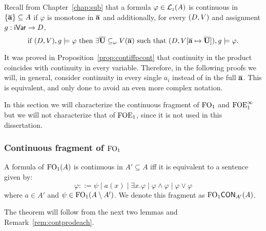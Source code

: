 
Recall from Chapter~\ref{chap:sub} that a formula $\varphi \in \mathcal{L}_{\scriptscriptstyle 1}(A)$ is continuous in $\{\overline{{\mathbf{a}}}\} \subseteq A$ if $\varphi$ is monotone in $\overline{{\mathbf{a}}}$ and additionally, for every $(D,V)$ and assignment $g:\mathsf{iVar}\to D$,
\[
\text{if } (D,\val),\ass \models \varphi \text{ then } \exists \vlist{U} \subseteq_\omega \val(\vlist{a}) \text{ such that } (D, \val[\vlist{a} \mapsto \vlist{U}]),\ass \models \varphi.
\]

\begin{remark}\label{rem:contprodeach}
	It was proved in Proposition~\ref{prop:contiffpcont} that continuity in the product coincides with continuity in every variable. Therefore, in the following proofs we will, in general, consider continuity in every single $a_i$ instead of in the full $\overline{{\mathbf{a}}}$. This is equivalent, and only done to avoid an even more complex notation.
\end{remark}

In this section we will characterize the continuous fragment of $\mathrm{FO}_1$ and $\mathrm{FOE}^{\infty}_1$ but we will not characterize that of $\mathrm{FOE}_1$, since it is not used in this dissertation.

\subsubsection{Continuous fragment of $\mathrm{FO}_1$}

\begin{theorem}\label{thm:ofocont}
A formula of $\mathrm{FO}_1(A)$ is continuous in $A' \subseteq A$ iff it is equivalent to a sentence given by:
\[
\varphi ::= \psi \mid a(x) \mid \exists x.\varphi \mid \varphi \land \varphi \mid \varphi \lor \varphi
\]
where $a\in A'$ and $\psi \in \mathrm{FO}_1(A\setminus A')$. We denote this fragment as $\mathrm{FO}_1\mathsf{CON}_{A'}(A)$.
\end{theorem}
%
The theorem will follow from the next two lemmas and Remark~\ref{rem:contprodeach}.

